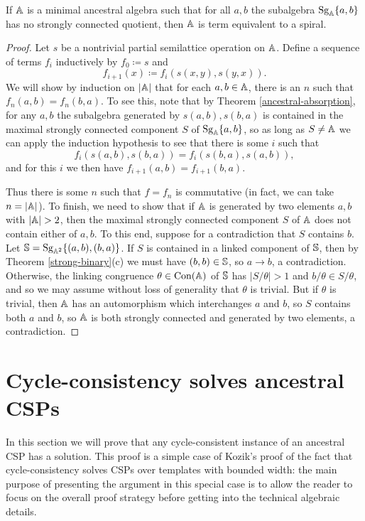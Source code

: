 \documentclass[letterpaper,11pt]{article}
\DeclareMathOperator{\Sg}{Sg}
\DeclareMathOperator{\Con}{Con}
\begin{document}
\begin{thm} If $\mathbb{A}$ is a minimal ancestral algebra such that for all $a,b$ the subalgebra $\Sg_{\bA}\{a,b\}$ has no strongly connected quotient, then $\mathbb{A}$ is term equivalent to a spiral.
\end{thm}
\begin{proof} Let $s$ be a nontrivial partial semilattice operation on $\mathbb{A}$. Define a sequence of terms $f_i$ inductively by $f_0 \coloneqq s$ and
\[
f_{i+1}(x) \coloneqq f_i(s(x,y),s(y,x)).
\]
We will show by induction on $|\mathbb{A}|$ that for each $a,b \in \mathbb{A}$, there is an $n$ such that $f_n(a,b) = f_n(b,a)$. To see this, note that by Theorem \ref{ancestral-absorption}, for any $a,b$ the subalgebra generated by $s(a,b), s(b,a)$ is contained in the maximal strongly connected component $S$ of $\Sg_\bA\{a,b\}$, so as long as $S \ne \mathbb{A}$ we can apply the induction hypothesis to see that there is some $i$ such that
\[
f_i(s(a,b),s(b,a)) = f_i(s(b,a),s(a,b)),
\]
and for this $i$ we then have $f_{i+1}(a,b) = f_{i+1}(b,a)$.

Thus there is some $n$ such that $f = f_n$ is commutative (in fact, we can take $n = |\mathbb{A}|$). To finish, we need to show that if $\mathbb{A}$ is generated by two elements $a,b$ with $|\mathbb{A}| > 2$, then the maximal strongly connected component $S$ of $\mathbb{A}$ does not contain either of $a,b$. To this end, suppose for a contradiction that $S$ contains $b$. Let $\bS = \Sg_{\bA^2}\{(a,b),(b,a)\}$. If $S$ is contained in a linked component of $\mathbb{S}$, then by Theorem \ref{strong-binary}(c) we must have $(b,b) \in \mathbb{S}$, so $a \rightarrow b$, a contradiction. Otherwise, the linking congruence $\theta \in \Con(\bA)$ of $\mathbb{S}$ has $|S/\theta| > 1$ and $b/\theta \in S/\theta$, and so we may assume without loss of generality that $\theta$ is trivial. But if $\theta$ is trivial, then $\mathbb{A}$ has an automorphism which interchanges $a$ and $b$, so $S$ contains both $a$ and $b$, so $\mathbb{A}$ is both strongly connected and generated by two elements, a contradiction.
\end{proof}


\section{Cycle-consistency solves ancestral CSPs}

In this section we will prove that any cycle-consistent instance of an ancestral CSP has a solution. This proof is a simple case of Kozik's proof \cite{slac} of the fact that cycle-consistency solves CSPs over templates with bounded width: the main purpose of presenting the argument in this special case is to allow the reader to focus on the overall proof strategy before getting into the technical algebraic details.
\end{document}
